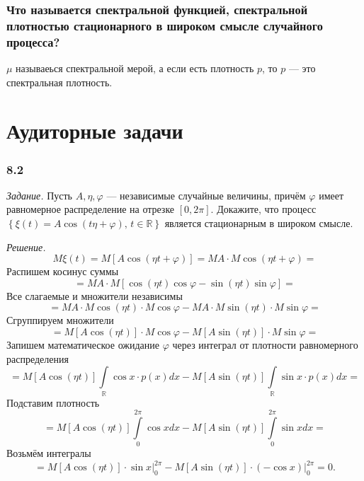 \subsubsection*{Что называется спектральной функцией, спектральной плотностью стационарного в
                широком смысле случайного процесса?}

$ \mu $ называеься спектральной мерой, а если есть плотность $p$, то $p$ ---
это спектральная плотность.

\section*{Аудиторные задачи}

\subsubsection*{8.2}

\textit{Задание.}
Пусть $A, \eta, \varphi $ --- независимые случайные величины,
причём $ \varphi $ имеет равномерное распределение на отрезке $ \left[ 0, 2 \pi \right] $.
Докажите, что процесс
$ \left\{
    \xi \left( t \right) = A \cos \left( t \eta + \varphi \right), \, t \in \mathbb{R}
  \right\} $
является стационарным в широком смысле.

\textit{Решение.}
$$M \xi \left( t \right) =
  M \left[ A \cos \left( \eta t + \varphi \right) \right] =
  MA \cdot M \cos \left( \eta t + \varphi \right) =$$
Распишем косинус суммы
$$= MA \cdot M \left[
    \cos \left( \eta t \right) \cos \varphi - \sin \left( \eta t \right) \sin \varphi \right] =$$
Все слагаемые и множители независимы
$$= MA \cdot M \cos \left( \eta t \right) \cdot M \cos \varphi -
  MA \cdot M \sin \left( \eta t \right) \cdot M \sin \varphi =$$
Сгруппируем множители
$$= M \left[ A \cos \left( \eta t \right) \right] \cdot M \cos \varphi -
  M \left[ A \sin \left( \eta t \right) \right] \cdot M \sin \varphi =$$
Запишем математическое ожидание $ \varphi $ через интеграл от плотности равномерного распределения
$$= M \left[ A \cos \left( \eta t \right) \right]
  \int \limits_{ \mathbb{R}} \cos x \cdot p \left( x \right) dx -
  M \left[ A \sin \left( \eta t \right) \right]
  \int \limits_{ \mathbb{R}} \sin x \cdot p \left( x \right) dx =$$
Подставим плотность
$$= M \left[ A \cos \left( \eta t \right) \right] \int \limits_0^{2 \pi } \cos xdx -
  M \left[ A \sin \left( \eta t \right) \right] \int \limits_0^{2 \pi } \sin xdx =$$
Возьмём интегралы
$$= M \left[ A \cos \left( \eta t \right) \right] \cdot \left. \sin x \right|_0^{2 \pi } -
  M \left[ A \sin \left( \eta t \right) \right] \cdot
  \left. \left( - \cos x \right) \right|_0^{2 \pi } =
  0.$$


